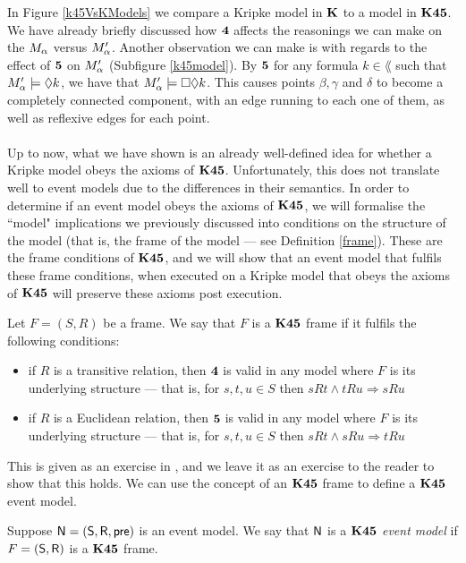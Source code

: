 In Figure \ref{k45VsKModels} we compare a Kripke model in $\bf K$ to a model in $\bf K45$.
We have already briefly discussed how $\bf 4$ affects the reasonings we can make on the $M_\alpha$ versus
$M'_\alpha$.
Another observation we can make is with regards to the effect of $\bf 5$ on $M'_\alpha$ (Subfigure
\ref{k45model}).
By $\bf 5$ for any formula $k \in \lang$ such that $M'_\alpha \models
\Diamond k$, we have that $M'_\alpha \models \Box \Diamond k$.
This causes points $\beta, \gamma$ and $\delta$ to become a completely connected component,
with an edge running to each one of them, as well as reflexive edges for each point.\\
\\
Up to now, what we have shown is an already well-defined idea for whether a Kripke model obeys the axioms of $\bf K45$.
Unfortunately, this does not translate well to event models due to the differences in their
semantics.
In order to determine if an event model obeys the axioms of $\bf K45$, we will formalise the ``model"
implications we previously discussed into conditions on the structure of the model (that is, the
frame of the model --- see Definition \ref{frame}).
These are the frame conditions of $\bf K45$, and we will show that an event model that fulfils these
frame conditions, when executed on a Kripke model that obeys the axioms of $\bf K45$ will preserve
these axioms post execution.

\begin{lemma} \label{lemma:k45frameconditions}
	Let $F = (S,R)$ be a frame.
	We say that $F$ is a $\bf K45$ frame if it fulfils the following conditions:
	\begin{itemize}
		\item if $R$ is a transitive relation, then $\bf 4$ is valid in any model where $F$ is its
			underlying structure --- that is, for $s, t, u \in S$ then $s R t \land t R u \Rightarrow s R u$
		\item if $R$ is a Euclidean relation, then $\bf 5$ is valid in any model where $F$ is its
			underlying structure --- that is, for $s, t, u \in S$ then $s R t \land s R u \Rightarrow t R u$
	\end{itemize}
\end{lemma}

This is given as an exercise in \cite{fagin1995reasoning}, and we leave it as an exercise to the
reader to show that this holds.
We can use the concept of an $\bf K45$ frame to define a $\bf K45$ event model.

\begin{defn} \label{defn:k45eventModel}
	Suppose $\mathrm{\mathsf{N}} = (\mathrm{\mathsf{S}}, \mathrm{\mathsf{R}}, \mathrm{\mathsf{pre}})$ is an event model.
	We say that $\mathrm{\mathsf{N}}$ is a {\em $\bf K45$ event model} if $F = (\mathrm{\mathsf{S}}, \mathrm{\mathsf{R}})$ is a $\bf K45$ frame.
\end{defn}


